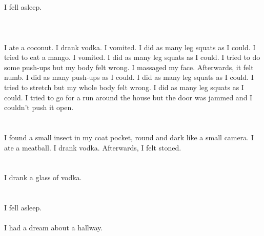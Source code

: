 \documentclass{article}
\begin{document}
    \section{}
    I fell asleep.\\\\ 
    \newpage
    
    \section{}
    I ate a coconut. I drank vodka. I vomited. I did as many leg squats as I could. I tried to eat a mango. I vomited.  I did as many leg squats as I could.  I tried to do some push-ups but my body felt wrong.  I massaged my face. Afterwards, it felt numb.  I did as many push-ups as I could.   I did as many leg squats as I could.  I tried to stretch but my whole body felt wrong.  I did as many leg squats as I could.  I tried to go for a run around the house but the door was jammed and I couldn't push it open.  
    \newpage
    
    \section{}
    I found a small insect in my coat pocket, round and dark like a small camera. I ate a meatball. I drank vodka. Afterwards, I felt stoned.  
    \newpage
    
    \section{}
    I drank a glass of vodka.  
    \newpage
    
    \section{}
    I fell asleep.\\\\I had a dream about a hallway.\\\\ 
    \newpage
    
\end{document}
